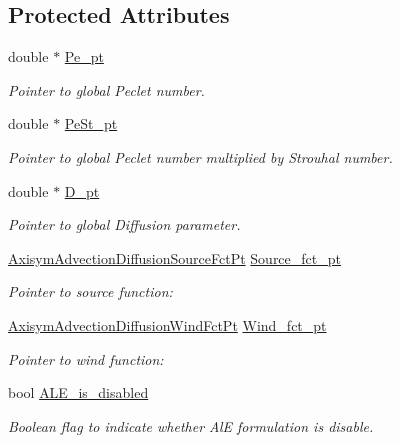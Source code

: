 \subsection*{Protected Attributes}
\begin{DoxyCompactItemize}
\item 
double $\ast$ \hyperlink{classoomph_1_1AxisymAdvectionDiffusionEquations_af1bc964a4a10482e926d7f241218413b}{Pe\+\_\+pt}
\begin{DoxyCompactList}\small\item\em Pointer to global Peclet number. \end{DoxyCompactList}\item 
double $\ast$ \hyperlink{classoomph_1_1AxisymAdvectionDiffusionEquations_a1b2246dfb6f3a23bf84a90c1b483b0ba}{Pe\+St\+\_\+pt}
\begin{DoxyCompactList}\small\item\em Pointer to global Peclet number multiplied by Strouhal number. \end{DoxyCompactList}\item 
double $\ast$ \hyperlink{classoomph_1_1AxisymAdvectionDiffusionEquations_add199570bdd8e75ffe12a37a8bc99ee2}{D\+\_\+pt}
\begin{DoxyCompactList}\small\item\em Pointer to global Diffusion parameter. \end{DoxyCompactList}\item 
\hyperlink{classoomph_1_1AxisymAdvectionDiffusionEquations_a5110527308cbe58e90fb9ac146d172a0}{Axisym\+Advection\+Diffusion\+Source\+Fct\+Pt} \hyperlink{classoomph_1_1AxisymAdvectionDiffusionEquations_a498d9045921930191e9a8022b7f5f1e5}{Source\+\_\+fct\+\_\+pt}
\begin{DoxyCompactList}\small\item\em Pointer to source function\+: \end{DoxyCompactList}\item 
\hyperlink{classoomph_1_1AxisymAdvectionDiffusionEquations_a53ee8d4a13b53896d66020591a8224b0}{Axisym\+Advection\+Diffusion\+Wind\+Fct\+Pt} \hyperlink{classoomph_1_1AxisymAdvectionDiffusionEquations_a8249037271ae5094b9682ea42731068a}{Wind\+\_\+fct\+\_\+pt}
\begin{DoxyCompactList}\small\item\em Pointer to wind function\+: \end{DoxyCompactList}\item 
bool \hyperlink{classoomph_1_1AxisymAdvectionDiffusionEquations_abef82e8104dd76a7ff53935efe41765d}{A\+L\+E\+\_\+is\+\_\+disabled}
\begin{DoxyCompactList}\small\item\em Boolean flag to indicate whether AlE formulation is disable. \end{DoxyCompactList}\end{DoxyCompactItemize}
